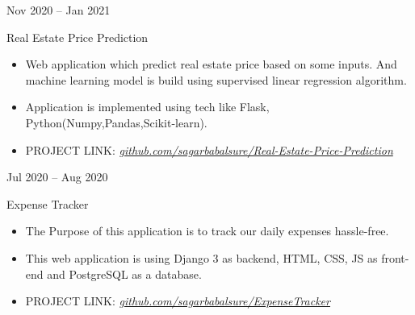 \documentclass[a4paper,10pt]{article}
\newlength{\cvcolumngapwidth}
\newlength{\cvleftcolumnwidth}
\newlength{\cvrightcolumnwidth}
\newcommand{\cvtitlestyle}[1]{{\large\cvtitlefont\textcolor{cvtitlecolor}{#1}}}
\newcommand{\cvdurationstyle}[1]{{\small\cvdurationfont\textcolor{cvdurationcolor}{#1}}}
\newlength{\cvafteritemskipamount}
\newlength{\cvaftertitleskipamount}
\newlength{\cvparskip}
\newcommand{\cvitem}[2]{
    \begin{minipage}[t]{\cvleftcolumnwidth}
        \raggedleft #1
    \end{minipage}%
    \hspace{\cvcolumngapwidth}%
    \begin{minipage}[t]{\cvrightcolumnwidth}
        \setlength{\parskip}{\cvparskip} #2
    \end{minipage}

    \vspace{\cvafteritemskipamount}
}
\newcommand{\cvtitle}[1]{
    \cvtitlestyle{#1}

    \vspace{\cvaftertitleskipamount}
    \vspace{-\cvparskip}
}
\begin{document}
\cvitem{
    \cvdurationstyle{Nov 2020 -- Jan 2021}
}{
    \cvtitle{Real Estate Price Prediction}


    \begin{itemize}[leftmargin=*]
        \item Web application which predict real estate price based on some inputs. And machine learning model is build using supervised linear regression algorithm. 
         \item Application is implemented using tech like Flask, Python(Numpy,Pandas,Scikit-learn). 
         \item PROJECT LINK: \textit{\href{https://github.com/sagarbabalsure/Real-Estate-Price-Prediction}{github.com/sagarbabalsure/Real-Estate-Price-Prediction}}
    \end{itemize}
}

\cvitem{
    \cvdurationstyle{Jul 2020 -- Aug 2020}
}{
    \cvtitle{Expense Tracker}

    \begin{itemize}[leftmargin=*]
        \item The Purpose of this application is to track our daily expenses hassle-free.
        \item This web application is using Django 3 as backend, HTML, CSS, JS as front-end and PostgreSQL as a database.
        \item PROJECT LINK: 
         \textit{\href{https://github.com/sagarbabalsure/ExpenseTracker}{github.com/sagarbabalsure/ExpenseTracker}}
    \end{itemize}
 }




\end{document}
